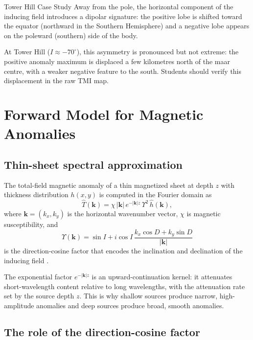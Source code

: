 \begin{activity}{Tower Hill Case Study}
Away from the pole, the horizontal component of the inducing field
introduces a dipolar signature: the positive lobe is shifted toward the
equator (northward in the Southern Hemisphere) and a negative lobe appears
on the poleward (southern) side of the body.

At Tower Hill ($I \approx -70^\circ$), this asymmetry is pronounced but not
extreme: the positive anomaly maximum is displaced a few kilometres
north of the maar centre, with a weaker negative feature to the south.
Students should verify this displacement in the raw TMI map.

\section{Forward Model for Magnetic Anomalies}

\subsection{Thin-sheet spectral approximation}

The total-field magnetic anomaly of a thin magnetized sheet at depth $z$
with thickness distribution $h(x,y)$ is computed in the Fourier domain as
\begin{equation}
\hat{T}(\mathbf{k})
  = \chi\,|\mathbf{k}|\,e^{-|\mathbf{k}|z}\,\Upsilon^2\,\hat{h}(\mathbf{k}),
\end{equation}
where $\mathbf{k} = (k_x, k_y)$ is the horizontal wavenumber vector,
$\chi$ is magnetic susceptibility, and
\begin{equation}
\Upsilon(\mathbf{k})
  = \sin I
    + i\cos I\,
      \frac{k_x\cos D + k_y\sin D}{|\mathbf{k}|}
\end{equation}
is the direction-cosine factor that encodes the inclination and declination
of the inducing field \citep{Blakely1995}.

The exponential factor $e^{-|\mathbf{k}|z}$ is an upward-continuation kernel:
it attenuates short-wavelength content relative to long wavelengths, with
the attenuation rate set by the source depth $z$.
This is why shallow sources produce narrow, high-amplitude anomalies and deep
sources produce broad, smooth anomalies.

\subsection{The role of the direction-cosine factor}


\end{activity}
